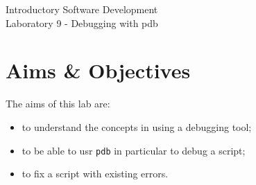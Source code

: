\documentclass[12pt,oneside]{cttutorial}
\begin{document}
\tutorialextra{}


 

\newcommand{\xkcd}[2]{
	\begin{center}
	\texttt{[image: ../../Figures/png/\#1]}
	\newline
	\url{http://xkcd.com/#2}
	\end{center}
	\bigskip
}

\newcommand{\alert}[1]
{\marginpar
  {\makebox[0 pt][l]
    {\texttt{[image: ../../Figures/png/warning.png]}
  }
  \parbox{2 cm}{{\sffamily \bfseries \tiny #1}}}}


\renewcommand{\baselinestretch}{1.5}
\textwidth=15cm

\newcommand{\I}{j}

\begin{center}
\begin{bfseries}
Introductory Software Development\\Laboratory 9 - Debugging with pdb
\end{bfseries}
\end{center}

\section{Aims \& Objectives}

The aims of this lab are:

\begin{itemize}
\item to understand the concepts in using a debugging tool;
\item to be able to usr \lstinline!pdb! in particular to debug a script;
\item to fix a script with existing errors.
\end{itemize}
\end{document}
